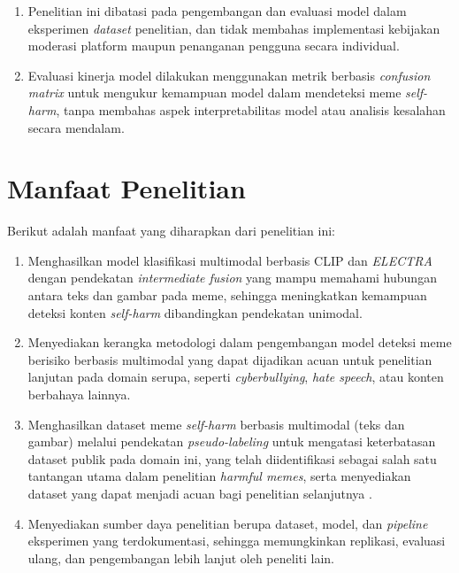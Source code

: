 \begin{enumerate}
    \item Penelitian ini dibatasi pada pengembangan dan evaluasi model dalam eksperimen \textit{dataset} penelitian, dan tidak membahas implementasi kebijakan moderasi platform maupun penanganan pengguna secara individual.
    
    \item Evaluasi kinerja model dilakukan menggunakan metrik berbasis \textit{confusion matrix} untuk mengukur kemampuan model dalam mendeteksi meme \textit{self-harm}, tanpa membahas aspek interpretabilitas model atau analisis kesalahan secara mendalam.
\end{enumerate}

\section{Manfaat Penelitian} \label{I.Manfaat}
Berikut adalah manfaat yang diharapkan dari penelitian ini: \par
\begin{enumerate}
    \item Menghasilkan model klasifikasi multimodal berbasis CLIP dan \textit{ELECTRA} dengan pendekatan \textit{intermediate fusion} yang mampu memahami hubungan antara teks dan gambar pada meme, sehingga meningkatkan kemampuan deteksi konten \textit{self-harm} dibandingkan pendekatan unimodal.
    
    \item Menyediakan kerangka metodologi dalam pengembangan model deteksi meme berisiko berbasis multimodal yang dapat dijadikan acuan untuk penelitian lanjutan pada domain serupa, seperti \textit{cyberbullying}, \textit{hate speech}, atau konten berbahaya lainnya.
    
    \item Menghasilkan dataset meme \textit{self-harm} berbasis multimodal (teks dan gambar) melalui pendekatan \textit{pseudo-labeling} untuk mengatasi keterbatasan dataset publik pada domain ini, yang telah diidentifikasi sebagai salah satu tantangan utama dalam penelitian \textit{harmful memes}, serta menyediakan dataset yang dapat menjadi acuan bagi penelitian selanjutnya \cite{Sharma2022HarmfulMemes}.
    
    \item Menyediakan sumber daya penelitian berupa dataset, model, dan \textit{pipeline} eksperimen yang terdokumentasi, sehingga memungkinkan replikasi, evaluasi ulang, dan pengembangan lebih lanjut oleh peneliti lain.
\end{enumerate}


